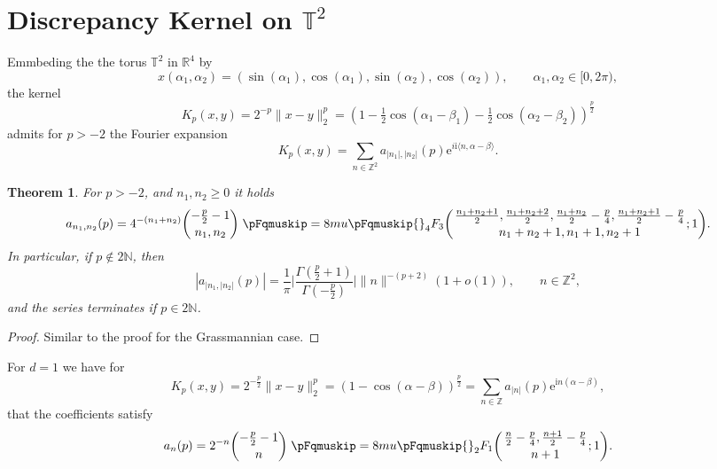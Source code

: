 \documentclass[%
a4paper,11pt,DIV=11,%
abstract=on%
]{scrartcl}
\newcommand{\N}{\ensuremath{\mathbb{N}}}
\newcommand*\pFq[6][8]{
  \begingroup %
  \pFqmuskip=#1mu\relax
  \begingroup\lccode`\~=`\,
  \lowercase{\endgroup\let~}\pFqcomma
  {}_{#2}F_{#3}{\left(\genfrac..{0pt}{}{#4}{#5};#6\right)}%
  \endgroup
}
\newcommand{\pFqcomma}{\mskip\pFqmuskip}
\newtheorem{thm}{Theorem}[section]
\begin{document}
\section{Discrepancy Kernel on $\mathbb T^{2}$}
Emmbeding the the torus $\mathbb T^{2}$ in $\mathbb R^{4}$ by
\[
  x(\alpha_{1},\alpha_{2}) = (\sin(\alpha_{1}),\cos(\alpha_{1}),\sin(\alpha_{2}),\cos(\alpha_{2})), \qquad \alpha_{1},\alpha_{2} \in [0,2\pi), 
\]
the kernel
\[
  K_{p}(x,y) = 2^{-p} \|x-y\|_{2}^{p} = (1-\tfrac 12\cos(\alpha_{1}-\beta_{1})-\tfrac 12\cos(\alpha_{2}-\beta_{2}))^{\frac{p}{2}} 
\]
admits for $p>-2$ the Fourier expansion
\[
  K_{p}(x,y) =\sum_{n \in \mathbb Z^{2}} a_{|n_{1}|,|n_{2}|}(p) \mathrm{e}^{i \mathrm{i} \langle n, \alpha-\beta\rangle}.
\]
\begin{thm}\label{thm:G24}
For $p>-2$, and $n_{1},n_{2} \ge 0$ it holds
\begin{equation}\label{eq:a alpha}
  a_{n_{1},n_{2}}(p) =  4^{-(n_{1}+n_{2})} {{-\frac{p}{2}-1}\choose{n_{1}, n_{2}}} \;\pFq{4}{3}{\tfrac{n_{1}+n_{2}+1}{2},\tfrac{n_{1}+n_{2}+2}{2},\tfrac{n_{1}+n_{2}}{2}-\tfrac{p}{4},\tfrac{n_{1}+n_{2}+1}{2}-\tfrac{p}{4}}{n_{1}+n_{2}+1,n_{1}+1,n_{2}+1}{1}.
\end{equation}
In particular, if $p\not\in 2\N$, then 
\begin{equation} \label{eq:dec-G24}
|a_{|n_{1},|n_{2}|}(p)|= \frac{1}{\pi} \bigg|\frac{\Gamma(\frac{p}{2}+1)}{\Gamma(-\frac{p}{2})}\bigg|\|n\|^{-(p+2)} (1+o(1)),
\qquad n \in \mathbb Z^{2},
\end{equation}
and the series terminates if $p\in 2\N$. 
\end{thm}
\begin{proof}
Similar to the proof for the Grassmannian case.
\end{proof}

For $d=1$ we have for
\[
  K_{p}(x,y) = 2^{-\frac p2}\|x-y\|_{2}^{p} = (1-\cos(\alpha-\beta))^{\frac p2} = \sum_{n \in \mathbb Z} a_{|n|}(p) \mathrm{e}^{\mathrm i n (\alpha-\beta)}, 
\]
that the coefficients satisfy
\[
 a_{n}(p) =  2^{-n} {{-\frac{p}{2}-1}\choose{n}}
  \;\pFq{2}{1}{\tfrac{n}{2}-\tfrac{p}{4},\tfrac{n+1}{2}-\tfrac{p}{4}}{n+1}{1}.
\]


\end{document}
